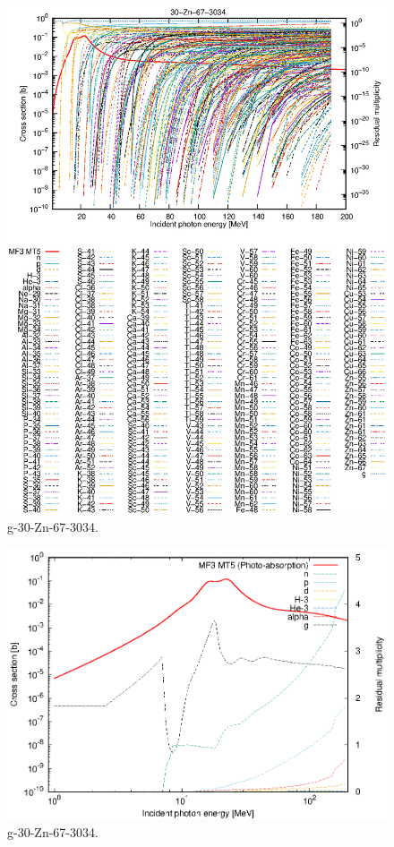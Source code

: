 \begin{figure}
 \includegraphics[width=\linewidth]{eps/g_30-Zn-67_3034.eps}
  \caption{g-30-Zn-67-3034.}
\end{figure}
\newpage \clearpage

\begin{figure}
 \includegraphics[width=\linewidth]{eps-log/g_30-Zn-67_3034.eps}
 \caption{g-30-Zn-67-3034.}
\end{figure}
\newpage \clearpage


